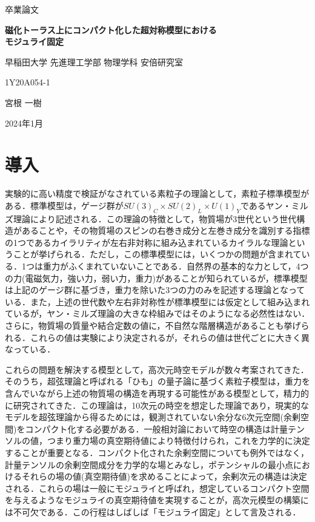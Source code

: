 \documentclass[a4paper,uplatex,dvipdfmx,10pt]{jsarticle}
\theoremstyle{definition}
\begin{document}
\begin{titlepage}
\begin{center}
\vspace*{10truemm}
\Large
卒業論文

\bigskip\bigskip
\textbf{\LARGE 
磁化トーラス上にコンパクト化した超対称模型における
\\
モジュライ固定
}

\vspace*{90truemm}
\large
早稲田大学 先進理工学部 物理学科 安倍研究室

\medskip
\large
1Y20A054-1

\bigskip
\Large
宮根 一樹

\bigskip\bigskip\bigskip\bigskip
\large
2024年1月
\end{center}
\end{titlepage}

\setcounter{tocdepth}{3}
\tableofcontents

\clearpage
\section{導入}

実験的に高い精度で検証がなされている素粒子の理論として，素粒子標準模型がある．標準模型は，ゲージ群が$SU(3)_{C}\times SU(2)_{L}\times U(1)_{Y}$であるヤン・ミルズ理論により記述される．この理論の特徴として，物質場が3世代という世代構造があることや，その物質場のスピンの右巻き成分と左巻き成分を識別する指標の1つであるカイラリティが左右非対称に組み込まれているカイラルな理論ということが挙げられる．ただし，この標準模型には，いくつかの問題が含まれている．1つは重力がふくまれていないことである．自然界の基本的な力として，4つの力(電磁気力，強い力，弱い力，重力)があることが知られているが，標準模型は上記のゲージ群に基づき，重力を除いた3つの力のみを記述する理論となっている．また，上述の世代数や左右非対称性が標準模型には仮定として組み込まれているが，ヤン・ミルズ理論の大きな枠組みではそのようになる必然性はない．さらに，物質場の質量や結合定数の値に，不自然な階層構造があることも挙げられる．これらの値は実験により決定されるが，それらの値は世代ごとに大きく異なっている．

これらの問題を解決する模型として，高次元時空モデルが数々考案されてきた．そのうち，超弦理論と呼ばれる「ひも」の量子論に基づく素粒子模型は，重力を含んでいながら上述の物質場の構造を再現する可能性がある模型として，精力的に研究されてきた．この理論は，10次元の時空を想定した理論であり，現実的なモデルを超弦理論から得るためには，観測されていない余分な6次元空間(余剰空間)をコンパクト化する必要がある．一般相対論において時空の構造は計量テンソルの値，つまり重力場の真空期待値により特徴付けられ，これを力学的に決定することが重要となる．コンパクト化された余剰空間についても例外ではなく，計量テンソルの余剰空間成分を力学的な場とみなし，ポテンシャルの最小点におけるそれらの場の値(真空期待値)を求めることによって，余剰次元の構造は決定される．これらの場は一般にモジュライと呼ばれ，想定しているコンパクト空間を与えるようなモジュライの真空期待値を実現することが，高次元模型の構築には不可欠である．この行程はしばしば「モジュライ固定」として言及される．
\end{document}
